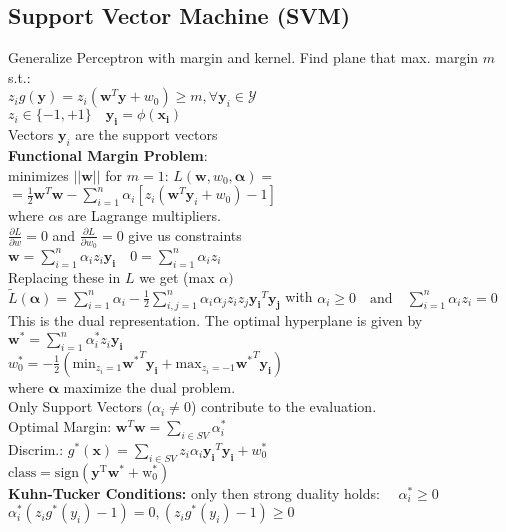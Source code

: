 \subsection*{Support Vector Machine (SVM)}
Generalize Perceptron with margin and kernel.
Find plane that max. margin $m$ s.t.:\\
$z_ig(\mathbf{y})=z_i(\mathbf{w}^T\mathbf{y}+w_0)\geq m,\forall \mathbf{y}_i \in \mathcal{Y}$\\
$z_i \in \{-1,+1\}\quad \mathbf{y_i} = \phi(\mathbf{x_i})$\\
Vectors $\mathbf{y}_i$ are the support vectors \\
\textbf{Functional Margin Problem}:\\
minimizes $||\mathbf{w}||$ for $m{=}1$: 
$L(\mathbf{w}, w_0, \mathbf{\alpha}) {=}$\\
$=\frac{1}{2}\mathbf{w}^T\mathbf{w}{-}\sum_{i=1}^n\alpha_i[z_i(\mathbf{w}^T\mathbf{y}_i{}+w_0){-}1]$\\
where $\alpha$s are Lagrange multipliers.\\
$\frac{\partial L}{\partial w} {=} 0$ and $\frac{\partial L}{\partial w_0} {=} 0$ give us constraints\\
$\mathbf{w}=\sum_{i=1}^n\alpha_iz_i\mathbf{y_i} \quad 0=\sum_{i=1}^n\alpha_iz_i$\\
Replacing these in $L$ we get (max $\alpha)$\\
$\tilde{L}(\mathbf{\alpha}){=}\sum_{i=1}^n\alpha_i{-}\frac{1}{2}\sum_{i,j=1}^n\alpha_i\alpha_jz_iz_j\mathbf{y_i}^T\mathbf{y_j}$
with $\alpha_i\geq0\quad\mathrm{and}\quad\sum_{i=1}^n\alpha_iz_i=0$\\
This is the dual representation.
The optimal hyperplane is given by\\
$\mathbf{w^*}=\sum_{i=1}^n\alpha_i^*z_i\mathbf{y_i}$\\
$ w_0^*{=}{-}\frac{1}{2}(\mathrm{min}_{z_i=1}\mathbf{w^*}^T\mathbf{y_i}{+}\mathrm{max}_{z_i=-1}\mathbf{w^*}^T\mathbf{y_i})$\\
where $\mathbf{\alpha}$ maximize the dual problem.\\
Only Support Vectors ($\alpha_i\not=0$) contribute to the evaluation.\\
Optimal Margin: $\mathbf{w}^T\mathbf{w}=\sum_{i\in SV}\alpha_i^*$\\
Discrim.: $g^*(\mathbf{x}){=}\sum_{i\in SV}z_i\alpha_i\mathbf{y_i}^T\mathbf{y_i}{+}w^*_0$\\
$\mathrm{class} = \mathrm{sign(\mathbf{y}^T\mathbf{w}^*+w_0^*)}$ \\
\textbf{Kuhn-Tucker Conditions:} only then strong duality holds: $\quad \alpha_i^* \geq 0$\\
$\alpha_i^*(z_ig^*(y_i)-1)= 0, (z_ig^*(y_i)-1) \geq 0$


